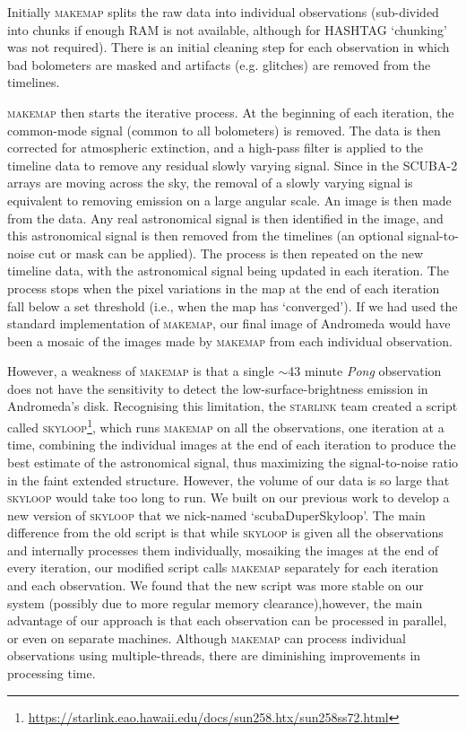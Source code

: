 \documentclass[a4paper,fleqn,usenatbib, twocolumn]{aastex63}
\begin{document}
Initially \textsc{makemap} splits the raw data into individual observations (sub-divided into
chunks if enough RAM is not available, although for HASHTAG `chunking' was not required). There is an initial cleaning step for each observation in which bad bolometers are masked and artifacts (e.g.
glitches) are removed from the timelines. 

\textsc{makemap} then starts the iterative process. At the beginning of each iteration, the common-mode signal (common to all bolometers) is removed. The data
is then corrected for atmospheric extinction, and a high-pass filter is applied to the
timeline data to remove any residual slowly varying signal. Since in the SCUBA-2 arrays are moving across the sky, the removal of a slowly varying signal is equivalent to removing emission on a large angular scale.
An image is then made from the data. Any real astronomical
signal is then identified in the image, and this astronomical signal is then removed from the
timelines (an optional signal-to-noise cut or mask can be applied). The process is then repeated on the new timeline data, with
the astronomical signal being updated in each iteration. 
The process stops when the pixel variations in the map at the end of each iteration fall below a set threshold (i.e., when
the map has `converged'). If we had used the standard implementation of \textsc{makemap}, our final image
of Andromeda would have been a mosaic of the images made by \textsc{makemap} from each
individual observation.

However, a weakness of \textsc{makemap} is that a single $\sim$43 minute \textit{Pong} observation does not have the sensitivity to detect the low-surface-brightness emission
in Andromeda's disk. Recognising this limitation, the \textsc{starlink} team created a script called 
\textsc{skyloop}\footnote{\url{https://starlink.eao.hawaii.edu/docs/sun258.htx/sun258ss72.html}}, 
which runs \textsc{makemap} on all the observations, one iteration at a time, combining the individual images at the end of each iteration
to produce the best estimate of the astronomical signal, thus maximizing the signal-to-noise ratio in the faint extended structure. However, the volume of our
data is so large that \textsc{skyloop} would take too long to run.
We built on our previous work \citep{Smith2019}
to develop a new version of \textsc{skyloop} that we nick-named `scubaDuperSkyloop'. 
The main difference from the old script is that while \textsc{skyloop}
 is given all the observations and internally processes them individually,
 mosaiking the images at the end of every iteration, our modified script calls \textsc{makemap} separately for each iteration and each observation. 
 We found that the new script was more stable on our system (possibly due to more regular memory clearance),however, the main advantage of our approach is that each observation can be processed in parallel, or even on
separate machines. Although \textsc{makemap} can process individual observations using multiple-threads, there are diminishing improvements
in processing time. 
\end{document}
